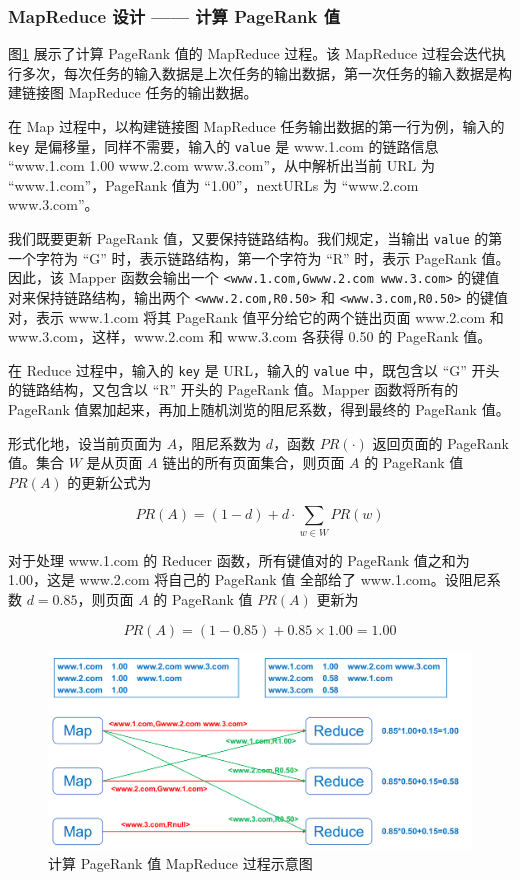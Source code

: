 \documentclass{ctexart}
\newcommand{\code}[1]{\colorbox{backcolor}{\lstinline|#1|}}
\begin{document}
    \subsubsection{MapReduce 设计 —— 计算 PageRank 值}\label{subsubsec:pagerank_calc}

    图\ref{fig:pagerank_calculate} 展示了计算 PageRank 值的 MapReduce 过程。该 MapReduce 过程会迭代执行多次，每次任务的输入数据是上次任务的输出数据，第一次任务的输入数据是构建链接图 MapReduce 任务的输出数据。

    在 Map 过程中，以构建链接图 MapReduce 任务输出数据的第一行为例，输入的 \code{key} 是偏移量，同样不需要，输入的 \code{value} 是 www.1.com 的链路信息 “www.1.com 1.00 www.2.com www.3.com”，从中解析出当前 URL 为 “www.1.com”，PageRank 值为 “1.00”，nextURLs 为 “www.2.com www.3.com”。

    我们既要更新 PageRank 值，又要保持链路结构。我们规定，当输出 \code{value} 的第一个字符为 “G” 时，表示链路结构，第一个字符为 “R” 时，表示 PageRank 值。因此，该 Mapper 函数会输出一个 \code{<www.1.com,Gwww.2.com www.3.com>} 的键值对来保持链路结构，输出两个 \code{<www.2.com,R0.50>} 和 \code{<www.3.com,R0.50>} 的键值对，表示 www.1.com 将其 PageRank 值平分给它的两个链出页面 www.2.com 和 www.3.com，这样，www.2.com 和 www.3.com 各获得 0.50 的 PageRank 值。

    在 Reduce 过程中，输入的 \code{key} 是 URL，输入的 \code{value} 中，既包含以 “G” 开头的链路结构，又包含以 “R” 开头的 PageRank 值。Mapper 函数将所有的 PageRank 值累加起来，再加上随机浏览的阻尼系数，得到最终的 PageRank 值\cite{wikipedia-pagerank}。

    形式化地，设当前页面为 $A$，阻尼系数为 $d$，函数 $PR(\cdot)$ 返回页面的 PageRank 值。集合 $W$ 是从页面 $A$ 链出的所有页面集合，则页面 $A$ 的 PageRank 值 $PR(A)$ 的更新公式为

    $$ PR(A) = (1-d) + d \cdot \sum_{w \in W} PR(w) $$

    对于处理 www.1.com 的 Reducer 函数，所有键值对的 PageRank 值之和为 1.00，这是 www.2.com 将自己的 PageRank 值 全部给了 www.1.com。设阻尼系数 $d=0.85$，则页面 $A$ 的 PageRank 值 $PR(A)$ 更新为

    $$ PR(A) = (1-0.85) + 0.85 \times 1.00 = 1.00 $$

    \begin{figure}[t]
        \centering
        \includegraphics[width=\textwidth]{src/pagerank_calculate}
        \caption{计算 PageRank 值 MapReduce 过程示意图}
        \label{fig:pagerank_calculate}
    \end{figure}
\end{document}

